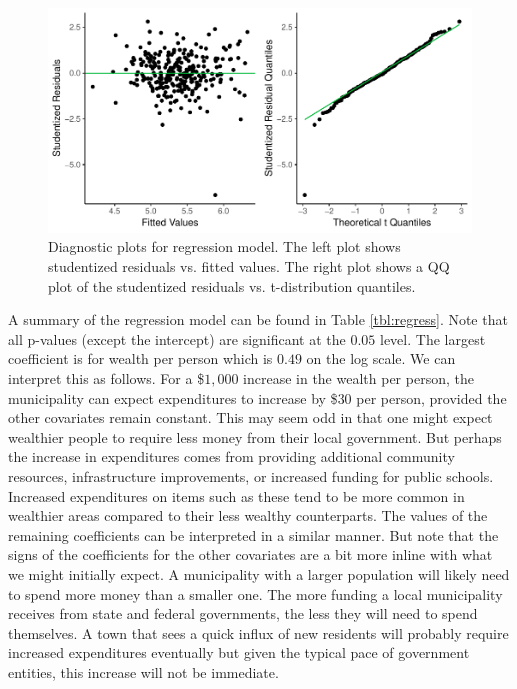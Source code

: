 \documentclass{article}\usepackage[]{graphicx}\usepackage[]{color}
\makeatletter
\def\maxwidth{ %
  \ifdim\Gin@nat@width>\linewidth
    \linewidth
  \else
    \Gin@nat@width
  \fi
}
\newenvironment{knitrout}{}{} %
\makeatother
\begin{document}
\begin{knitrout}
\color{fgcolor}\begin{figure}
\includegraphics[width=\maxwidth]{figure/r_diag_plots-1} \caption{\label{fig:diag} Diagnostic plots for regression model. The left plot shows studentized residuals vs. fitted values. The right plot shows a QQ plot of the studentized residuals vs. t-distribution quantiles.}\label{fig:r diag_plots}
\end{figure}


\end{knitrout}

A summary of the regression model can be found in Table \ref{tbl:regress}. Note that all p-values (except the intercept) are significant at the $0.05$ level. The largest coefficient is for wealth per person which is $0.49$ on the log scale. We can interpret this as follows. For a \$$1,000$ increase in the wealth per person, the municipality can expect expenditures to increase by \$$30$ per person, provided the other covariates remain constant. This may seem odd in that one might expect wealthier people to require less money from their local government. But perhaps the increase in expenditures comes from providing additional community resources, infrastructure improvements, or increased funding for public schools. Increased expenditures on items such as these tend to be more common in wealthier areas compared to their less wealthy counterparts. The values of the remaining coefficients can be interpreted in a similar manner. But note that the signs of the coefficients for the other covariates are a bit more inline with what we might initially expect. A municipality with a larger population will likely need to spend more money than a smaller one. The more funding a local municipality receives from state and federal governments, the less they will need to spend themselves. A town that sees a quick influx of new residents will probably require increased expenditures eventually but given the typical pace of government entities, this increase will not be immediate.
\end{document}
